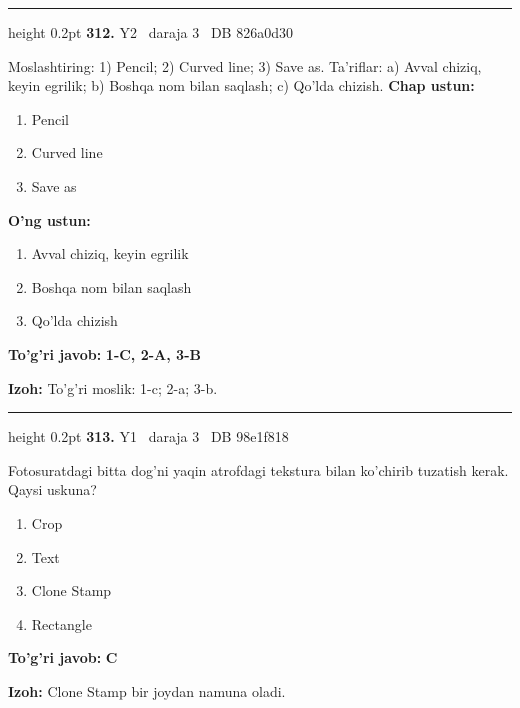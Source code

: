 \documentclass[10pt,a4paper,oneside]{article}
\begin{document}
\vspace{2mm}\hrule height 0.2pt \vspace{4mm}
\hypertarget{q312}{\textbf{\color{ink}312.}}  {\color{muted}\scriptsize Y2 \textbullet\ daraja 3 \textbullet\ DB 826a0d30}
\par
Moslashtiring: 1) Pencil; 2) Curved line; 3) Save as. Ta'riflar: a) Avval chiziq, keyin egrilik; b) Boshqa nom bilan saqlash; c) Qo'lda chizish.
\textbf{\footnotesize Chap ustun:}
\begin{enumerate}[label=\arabic*),leftmargin=9mm]
\item Pencil
\item Curved line
\item Save as
\end{enumerate}
\textbf{\footnotesize O'ng ustun:}
\begin{enumerate}[label=\Alph*),leftmargin=9mm]
\item Avval chiziq, keyin egrilik
\item Boshqa nom bilan saqlash
\item Qo'lda chizish
\end{enumerate}
\begin{tcolorbox}[enhanced,breakable,colback=teal!4,colframe=teal!45!black,boxrule=0.45pt,arc=1.2mm,left=2.8mm,right=2.8mm,top=2mm,bottom=2mm,before skip=2mm,after skip=2mm]
\textbf{\color{teal}To'g'ri javob:} \textbf{1-C, 2-A, 3-B}
\par\smallskip
\textbf{Izoh:} To'g'ri moslik: 1-c; 2-a; 3-b.
\end{tcolorbox}
\vspace{2mm}\hrule height 0.2pt \vspace{4mm}
\hypertarget{q313}{\textbf{\color{ink}313.}}  {\color{muted}\scriptsize Y1 \textbullet\ daraja 3 \textbullet\ DB 98e1f818}
\par
Fotosuratdagi bitta dog'ni yaqin atrofdagi tekstura bilan ko'chirib tuzatish kerak. Qaysi uskuna?
\begin{enumerate}[label=\Alph*),leftmargin=9mm]
\item Crop
\item Text
\item Clone Stamp
\item Rectangle
\end{enumerate}
\begin{tcolorbox}[enhanced,breakable,colback=teal!4,colframe=teal!45!black,boxrule=0.45pt,arc=1.2mm,left=2.8mm,right=2.8mm,top=2mm,bottom=2mm,before skip=2mm,after skip=2mm]
\textbf{\color{teal}To'g'ri javob:} \textbf{C}
\par\smallskip
\textbf{Izoh:} Clone Stamp bir joydan namuna oladi.
\end{tcolorbox}
\end{document}
